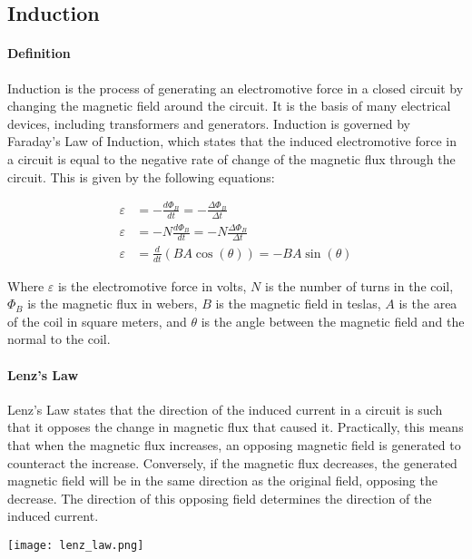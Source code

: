 \subsection{Induction}
\hrulefill

\paragraph*{Definition}
Induction is the process of generating an electromotive force in a closed circuit by changing the magnetic field around the circuit.
It is the basis of many electrical devices, including transformers and generators. Induction is governed by Faraday's Law of Induction,
which states that the induced electromotive force in a circuit is equal to the negative rate of change of the magnetic flux through 
the circuit. This is given by the following equations:

\begin{align*}
    \varepsilon &= -\frac{d\Phi_B}{dt} = -\frac{\Delta \Phi_B}{\Delta t}\\
    \varepsilon &= -N\frac{d\Phi_B}{dt} = -N\frac{\Delta \Phi_B}{\Delta t}\\
    \varepsilon &= \frac{d}{dt}(BA\cos(\theta)) = -BA\sin(\theta)
\end{align*}

Where $\varepsilon$ is the electromotive force in volts, $N$ is the number of turns in the coil, $\Phi_B$ is the magnetic flux in webers,
$B$ is the magnetic field in teslas, $A$ is the area of the coil in square meters, and $\theta$ is the angle between the magnetic field
and the normal to the coil.\\

\paragraph*{Lenz's Law}
Lenz's Law states that the direction of the induced current in a circuit is such that it opposes the change in magnetic flux that caused it. 
Practically, this means that when the magnetic flux increases, an opposing magnetic field is generated to counteract the increase. 
Conversely, if the magnetic flux decreases, the generated magnetic field will be in the same direction as the original field, opposing the 
decrease. The direction of this opposing field determines the direction of the induced current.

\begin{center}
    \texttt{[image: lenz\_law.png]}
\end{center}